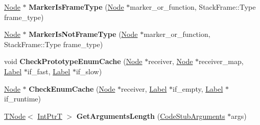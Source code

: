 \begin{DoxyCompactItemize}
\mbox{\hyperlink{classv8_1_1internal_1_1compiler_1_1Node}{Node}} $\ast$ {\bfseries Marker\+Is\+Frame\+Type} (\mbox{\hyperlink{classv8_1_1internal_1_1compiler_1_1Node}{Node}} $\ast$marker\+\_\+or\+\_\+function, Stack\+Frame\+::\+Type frame\+\_\+type)
\item 
\mbox{\label{classv8_1_1internal_1_1CodeStubAssembler_a5da38395f9c9d006acfa213c43af175c}} 
\mbox{\hyperlink{classv8_1_1internal_1_1compiler_1_1Node}{Node}} $\ast$ {\bfseries Marker\+Is\+Not\+Frame\+Type} (\mbox{\hyperlink{classv8_1_1internal_1_1compiler_1_1Node}{Node}} $\ast$marker\+\_\+or\+\_\+function, Stack\+Frame\+::\+Type frame\+\_\+type)
\item 
\mbox{\label{classv8_1_1internal_1_1CodeStubAssembler_a2892ecb99340b70a7cc66b14f0fa1e09}} 
void {\bfseries Check\+Prototype\+Enum\+Cache} (\mbox{\hyperlink{classv8_1_1internal_1_1compiler_1_1Node}{Node}} $\ast$receiver, \mbox{\hyperlink{classv8_1_1internal_1_1compiler_1_1Node}{Node}} $\ast$receiver\+\_\+map, \mbox{\hyperlink{classv8_1_1internal_1_1compiler_1_1CodeAssemblerLabel}{Label}} $\ast$if\+\_\+fast, \mbox{\hyperlink{classv8_1_1internal_1_1compiler_1_1CodeAssemblerLabel}{Label}} $\ast$if\+\_\+slow)
\item 
\mbox{\label{classv8_1_1internal_1_1CodeStubAssembler_acf7f5909f1800cfac686a6fdac0cebb0}} 
\mbox{\hyperlink{classv8_1_1internal_1_1compiler_1_1Node}{Node}} $\ast$ {\bfseries Check\+Enum\+Cache} (\mbox{\hyperlink{classv8_1_1internal_1_1compiler_1_1Node}{Node}} $\ast$receiver, \mbox{\hyperlink{classv8_1_1internal_1_1compiler_1_1CodeAssemblerLabel}{Label}} $\ast$if\+\_\+empty, \mbox{\hyperlink{classv8_1_1internal_1_1compiler_1_1CodeAssemblerLabel}{Label}} $\ast$if\+\_\+runtime)
\item 
\mbox{\label{classv8_1_1internal_1_1CodeStubAssembler_a7d1f0fab92a08179e72b15bcc95c583c}} 
\mbox{\hyperlink{classv8_1_1internal_1_1compiler_1_1TNode}{T\+Node}}$<$ \mbox{\hyperlink{structv8_1_1internal_1_1IntPtrT}{Int\+PtrT}} $>$ {\bfseries Get\+Arguments\+Length} (\mbox{\hyperlink{classv8_1_1internal_1_1CodeStubArguments}{Code\+Stub\+Arguments}} $\ast$args)
\item 
\mbox{\label{classv8_1_1internal_1_1CodeStubAssembler_ae6311a2e4da04ec888af3a858a130233}} 

\end{DoxyCompactItemize}
